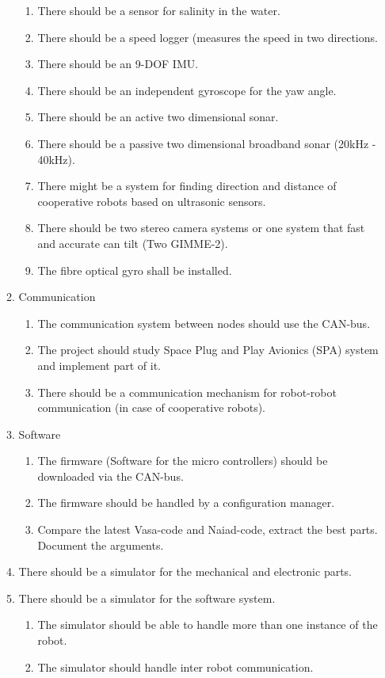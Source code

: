 \begin{enumerate}
\begin{enumerate}
\begin{enumerate}
\item There should be a sensor for salinity in the water.
\item There should be a speed logger (measures the speed in two directions.
\item There should be an 9-DOF IMU.
\item There should be an independent gyroscope for the yaw angle.
\item There should be an active two dimensional sonar.
\item There should be a passive two dimensional broadband sonar (20kHz  - 40kHz).
\item There might be a system for finding direction and distance of cooperative robots based on ultrasonic sensors.
\item There should be two stereo camera systems or one system that fast and accurate can tilt (Two GIMME-2).
\item The fibre optical gyro shall be installed.
\end{enumerate}
\item Communication
\begin{enumerate}
\item The communication system between nodes should use the CAN-bus.
\item The project should study Space Plug and Play Avionics (SPA) system and implement part of it.
\item There should be a communication mechanism for robot-robot communication (in case of cooperative robots).
\end{enumerate}
\item Software
\begin{enumerate}
\item The firmware (Software for the micro controllers) should be downloaded via the CAN-bus.
\item The firmware should be handled by a configuration manager.
\item Compare the latest Vasa-code and Naiad-code, extract the best parts. Document the arguments.
\end{enumerate}
\item There should be a simulator for the mechanical and electronic parts.
\item There should be a simulator for the software system.
\begin{enumerate}
\item The simulator should be able to handle more than one instance of the robot.
\item The simulator should handle inter robot communication. 

\end{enumerate}
\end{enumerate}
\end{enumerate}
